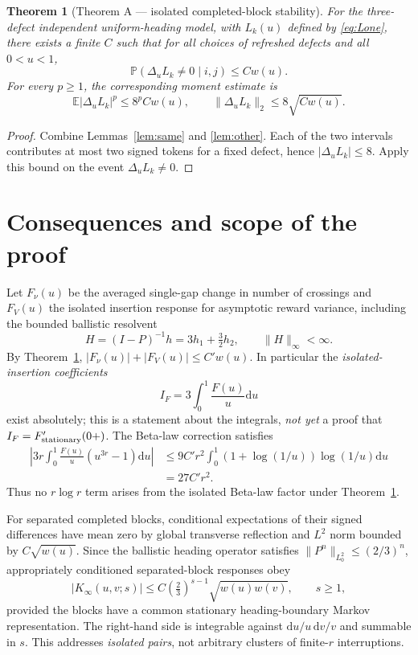 \documentclass[11pt]{article}
\newtheorem{theorem}{Theorem}[section]
\theoremstyle{remark}\newtheorem{remark}[theorem]{Remark}
\newcommand{\E}{\mathbb E}\newcommand{\Prb}{\mathbb P}\newcommand{\dd}{\mathrm d}
\begin{document}
\begin{theorem}[Theorem A --- isolated completed-block stability]\label{thm:A}
For the three-defect independent uniform-heading model, with $L_k(u)$ defined by \eqref{eq:Lone}, there exists a finite $C$ such that for all choices of refreshed defects and all $0<u<1$,
\begin{equation}\boxed{\Prb(\Delta_uL_k\ne0\mid i,j)\le Cw(u).}\label{eq:A}
\end{equation}
For every $p\ge1$, the corresponding moment estimate is
\begin{equation}\label{eq:Amoment}
\E|\Delta_uL_k|^p\le8^pCw(u),\qquad
\|\Delta_uL_k\|_2\le8\sqrt{Cw(u)}.
\end{equation}
\end{theorem}
\begin{proof}Combine Lemmas~\ref{lem:same} and \ref{lem:other}. Each of the two intervals contributes at most two signed tokens for a fixed defect, hence $|\Delta_uL_k|\le8$. Apply this bound on the event $\Delta_uL_k\ne0$.\end{proof}

\section{Consequences and scope of the proof}
Let $F_\nu(u)$ be the averaged single-gap change in number of crossings and $F_V(u)$ the isolated insertion response for asymptotic reward variance, including the bounded ballistic resolvent
\[H=(I-P)^{-1}h=3h_1+\tfrac32h_2,\qquad \|H\|_\infty<\infty.\]
By Theorem~\ref{thm:A}, $|F_\nu(u)|+|F_V(u)|\le C' w(u)$. In particular the \emph{isolated-insertion coefficients}
\[I_F=3\int_0^1\frac{F(u)}u\dd u\]
exist absolutely; this is a statement about the integrals, \emph{not yet} a proof that $I_F=F_{\rm stationary}'(0+)$. The Beta-law correction satisfies
\begin{align}
\left|3r\int_0^1\frac{F(u)}u(u^{3r}-1)\dd u\right|
&\le9C'r^2\int_0^1(1+\log(1/u))\log(1/u)\dd u\\
&=27C'r^2.\label{eq:betaO2}
\end{align}
Thus no $r\log r$ term arises from the isolated Beta-law factor under Theorem~\ref{thm:A}.

For separated completed blocks, conditional expectations of their signed differences have mean zero by global transverse reflection and $L^2$ norm bounded by $C\sqrt{w(u)}$. Since the ballistic heading operator satisfies $\|P^n\|_{L^2_0}\le(2/3)^n$, appropriately conditioned separated-block responses obey
\begin{equation}\label{eq:separated}
|K_\infty(u,v;s)|\le C\left(\tfrac23\right)^{s-1}\sqrt{w(u)w(v)},\qquad s\ge1,
\end{equation}
provided the blocks have a common stationary heading-boundary Markov representation. The right-hand side is integrable against $\dd u/u\,\dd v/v$ and summable in $s$. This addresses \emph{isolated pairs}, not arbitrary clusters of finite-$r$ interruptions.
\end{document}
